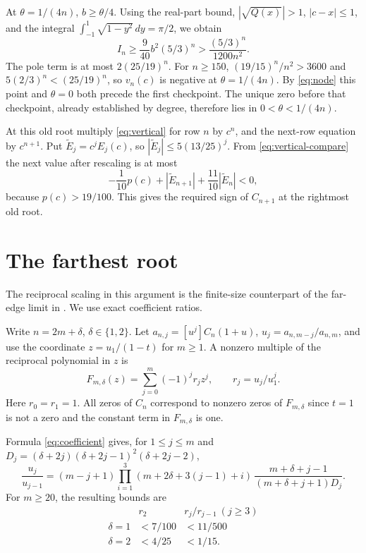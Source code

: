 \documentclass[11pt]{article}
\begin{document}
At \(\theta=1/(4n)\), \(b\ge\theta/4\). Using the real-part bound, \(|\sqrt{Q(x)}|>1\), \(|c-x|\le1\), and the integral \(\int_{-1}^1\sqrt{1-y^2}\,dy=\pi/2\), we obtain
\[
I_n\ge\frac9{40}b^2(5/3)^n>\frac{(5/3)^n}{1200n^2}.
\]
The pole term is at most \(2(25/19)^n\). For \(n\ge150\), \((19/15)^n/n^2>3600\) and \(5(2/3)^n<(25/19)^n\), so \(v_n(c)\) is negative at \(\theta=1/(4n)\). By \eqref{eq:node} this point and \(\theta=0\) both precede the first checkpoint. The unique zero before that checkpoint, already established by degree, therefore lies in \(0<\theta<1/(4n)\).

At this old root multiply \eqref{eq:vertical} for row \(n\) by \(c^n\), and the next-row equation by \(c^{n+1}\). Put \(\widetilde E_j=c^j E_j(c)\), so \(|\widetilde E_j|\le5(13/25)^j\). From \eqref{eq:vertical-compare} the next value after rescaling is at most
\[
-\frac1{10}p(c)+|\widetilde E_{n+1}|+\frac{11}{10}|\widetilde E_n|<0,
\]
because \(p(c)>19/100\). This gives the required sign of \(C_{n+1}\) at the rightmost old root.

\section{The farthest root}\label{sec:left}

The reciprocal scaling in this argument is the finite-size counterpart of the far-edge limit in \cite[\S3]{eventual}. We use exact coefficient ratios.

Write $n=2m+\delta$, $\delta\in\{1,2\}$. Let $a_{n,j}=[u^j]C_n(1+u)$, $u_j=a_{n,m-j}/a_{n,m}$, and use the coordinate $z=u_1/(1-t)$ for $m\ge1$. A nonzero multiple of the reciprocal polynomial in $z$ is
\[
F_{m,\delta}(z)=\sum_{j=0}^m (-1)^j r_j z^j,
\qquad r_j=u_j/u_1^j.
\]
Here $r_0=r_1=1$. All zeros of $C_n$ correspond to nonzero zeros of $F_{m,\delta}$ since $t=1$ is not a zero and the constant term in $F_{m,\delta}$ is one.

Formula \eqref{eq:coefficient} gives, for $1\le j\le m$ and
$D_j=(\delta+2j)(\delta+2j-1)^2(\delta+2j-2)$,
\begin{equation}
\frac{u_j}{u_{j-1}}
=(m-j+1)\prod_{i=1}^3(m+2\delta+3(j-1)+i)\,
        \frac{m+\delta+j-1}{(m+\delta+j+1)D_j}.
\label{eq:ratio}
\end{equation}
For $m\ge20$, the resulting bounds are
\begin{equation}
\begin{array}{c|cc}
 & r_2 & r_j/r_{j-1} \ (j\ge3)\\
\hline
\delta=1 & <7/100 & <11/500\\
\delta=2 & <4/25 & <1/15 .
\end{array}
\label{eq:ratio-table}
\end{equation}
\end{document}
